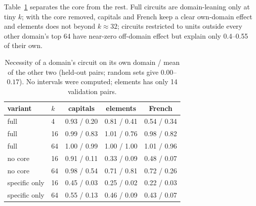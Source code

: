 \documentclass[11pt]{article}
\begin{document}
Table~\ref{tab:entangle} separates the core from the rest. Full circuits are domain-leaning only at tiny $k$; with the core removed, capitals and French keep a clear own-domain effect and elements
does not beyond $k\approx32$; circuits restricted to units outside every other domain's top 64 have near-zero off-domain effect but explain only 0.4--0.55 of their own.
\begin{table}[h]
\centering\small
\begin{tabular}{llccc}
\toprule
variant & $k$ & capitals & elements & French\\
\midrule
full & 4  & 0.93 / 0.20 & 0.81 / 0.41 & 0.54 / 0.34\\
full & 16 & 0.99 / 0.83 & 1.01 / 0.76 & 0.98 / 0.82\\
full & 64 & 1.00 / 0.99 & 1.00 / 1.00 & 1.01 / 0.96\\
no core & 16 & 0.91 / 0.11 & 0.33 / 0.09 & 0.48 / 0.07\\
no core & 64 & 0.98 / 0.54 & 0.71 / 0.81 & 0.72 / 0.26\\
specific only & 16 & 0.45 / 0.03 & 0.25 / 0.02 & 0.22 / 0.03\\
specific only & 64 & 0.55 / 0.13 & 0.46 / 0.09 & 0.43 / 0.07\\
\bottomrule
\end{tabular}
\caption{Necessity of a domain's circuit on its own domain / mean of the other two (held-out pairs; random sets give $0.00$--$0.17$). No intervals were computed; elements has only 14 validation pairs.}
\label{tab:entangle}
\end{table}
\end{document}
